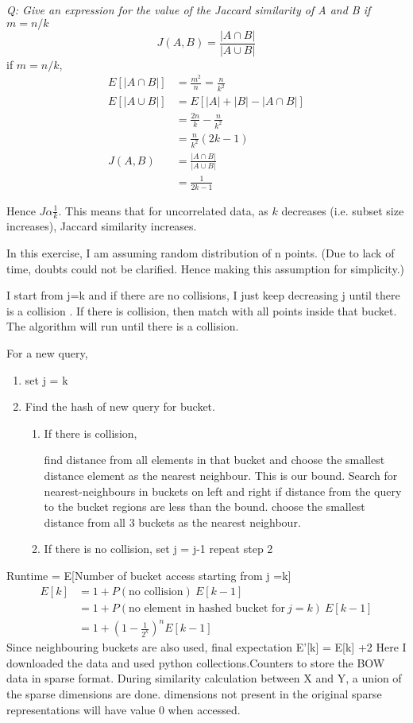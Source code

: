 \documentclass{homeworg}
\begin{document}
\emph{Q: Give an expression for the value of the Jaccard similarity of A and B if $m = n/k$}
$$
J(A,B) = \frac{|A \cap B|}{|A \cup B|}
$$
if $m = n/k$, 
\begin{align*}
    E[|A \cap B|] &=  \frac{m^2}{n} = \frac{n}{k^2}\\
    E[|A \cup B|] &=  E[|A| + |B| - |A \cap B|]\\
    & = \frac{2n}{k} - \frac{n}{k^2}\\
    & = \frac{n}{k^2} (2k- 1)\\
    J(A,B) &= \frac{|A \cap B|}{|A \cup B|}\\
    &=\frac{1}{2k-1}
\end{align*}

Hence $J \alpha \frac{1}{k}$. This means that for uncorrelated data, as $k$ decreases (i.e. subset size increases), Jaccard similarity increases.

\newpage
\exercise
In this exercise,  I am assuming random distribution of n points. (Due to lack of time, doubts could not be clarified. Hence making this assumption for simplicity.)

I start from j=k and if there are no collisions, I just keep decreasing j until there is a collision . If there is collision, then match with all points inside that bucket. The algorithm will run until there is a collision. 

For a new query,
\begin{enumerate}
    \item set j = k
    \item Find the hash of new query for bucket. 
        \begin{enumerate}
            \item If there is collision,
            
     find distance from all elements in that bucket and choose the smallest distance element as the nearest neighbour. This is our bound. Search for nearest-neighbours in buckets on left and right if distance from the query to the bucket regions are less than the bound. choose the smallest distance from all 3 buckets as the nearest neighbour.
            
            \item If there is no collision, set j = j-1
            repeat step 2
        \end{enumerate}
    
\end{enumerate}

Runtime = E[Number of bucket access starting from j =k]
\begin{align*}
E[k]&= 1  + P(\text{no collision})\ E[k-1] \\
&= 1 + P(\text{no element in hashed bucket for}\ j=k)\ E[k-1] \\
&= 1+ \left(1-\frac{1}{2^k}\right)^n E[k-1]
\end{align*}
Since neighbouring buckets are also used, final expectation
E'[k] = E[k] +2 
\newpage
\exercise
Here I downloaded the data and used python collections.Counters to store the BOW data in sparse format. During similarity calculation between X and Y, a union of the sparse dimensions are done. dimensions not present in the original sparse representations will have value 0 when accessed.
\end{document}
